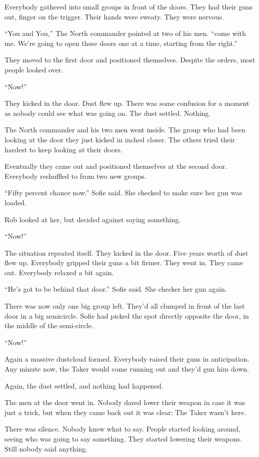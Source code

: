 \documentclass[letterpaper,12pt]{report}
\begin{document}
Everybody gathered into small groups in front of the doors. They had their guns out, finger on the trigger. Their hands were sweaty. They were nervous.

``You and You,'' The North commander pointed at two of his men. ``come with me. We're going to open these doors one at a time, starting from the right.''

They moved to the first door and positioned themselves. Despite the orders, most people looked over.

``Now!''

They kicked in the door. Dust flew up. There was some confusion for a moment as nobody could see what was going on. The dust settled. Nothing.

The North commander and his two men went inside. The group who had been looking at the door they just kicked in inched closer. The others tried their hardest to keep looking at their doors.

Eventually they came out and positioned themselves at the second door. Everybody reshuffled to from two new groups.

``Fifty percent chance now.'' Sofie said. She checked to make sure her gun was loaded.

Rob looked at her, but decided against saying something.

``Now!''

The situation repeated itself. They kicked in the door. Five years worth of dust flew up. Everybody gripped their guns a bit firmer. They went in. They came out. Everybody relaxed a bit again.

``He's got to be behind that door.'' Sofie said. She checker her gun again.

There was now only one big group left. They'd all clumped in front of the last door in a big semicircle. Sofie had picked the spot directly opposite the door, in the middle of the semi-circle.

``Now!''

Again a massive dustcloud formed. Everybody raised their guns in anticipation. Any minute now, the Taker would come running out and they'd gun him down.

Again, the dust settled, and nothing had happened.

The men at the door went in. Nobody dared lower their weapon in case it was just a trick, but when they came back out it was clear: The Taker wasn't here.

There was silence. Nobody knew what to say. People started looking around, seeing who was going to say something. They started lowering their weapons. Still nobody said anything.
\end{document}
